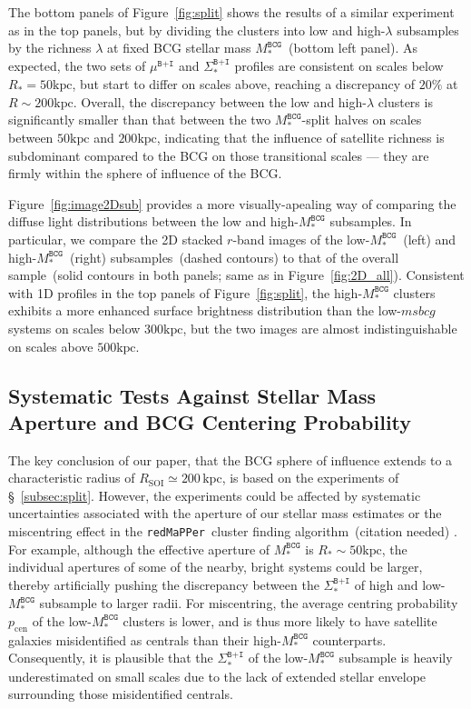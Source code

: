 \documentclass[fleqn,usenatbib]{mnras}
\newcommand{\rsoi}{R_{\mathrm{SOI}}}
\newcommand{\sigbi}{\Sigma_*^{\texttt{B+I}}}
\newcommand{\mubi}{\mu^{\texttt{B+I}}}
\newcommand{\msbcg}{M_*^{\texttt{BCG}}}
\newcommand{\kpc}{\mathrm{kpc}}
\newcommand{\pcen}{p_{\mathrm{cen}}}
\newcommand\xkchen[1]{{\color{cyan} {#1}}}
\newcommand*\citeme{{\color{green}(citation needed)}}
\newcommand\redmapper{\texttt{redMaPPer}}
\begin{document}
The bottom panels of Figure~\ref{fig:split} shows the results of a similar
experiment as in the top panels, but by dividing the clusters into low and
high-$\lambda$ subsamples by the richness $\lambda$ at fixed BCG stellar
mass $\msbcg$~(bottom left panel). As expected, the two sets of $\mubi$ and
$\sigbi$ profiles are consistent on scales below $R_*{=}50\kpc$, but start
to differ on scales above, reaching
a discrepancy of $20\%$ at $R{\sim}200\kpc$. Overall, the discrepancy
between the low and high-$\lambda$ clusters is significantly smaller than
that between the two $\msbcg$-split halves on scales between $50\kpc$ and
$200\kpc$, indicating that the influence of satellite richness is
subdominant compared to the BCG on those transitional scales --- they are
firmly within the sphere of influence of the BCG.



Figure~\ref{fig:image2Dsub} provides a more visually-apealing way of
comparing the diffuse light distributions between the low and high-$\msbcg$
subsamples.  In particular, we compare the 2D stacked $r$-band images of
the low-$\msbcg$~(left) and high-$\msbcg$~(right) subsamples~(dashed
contours) to that of the overall sample~(solid contours in both panels;
same as in Figure~\ref{fig:2D_all}). Consistent with 1D profiles in the top
panels of Figure~\ref{fig:split}, the high-$\msbcg$ clusters exhibits a
more enhanced surface brightness distribution than the low-$msbcg$ systems
on scales below $300\kpc$, but the two images are almost indistinguishable
on scales above $500\kpc$.


\subsection{Systematic Tests Against Stellar Mass Aperture and BCG
Centering Probability}
\label{subsec:test}


The key conclusion of our paper, that the BCG sphere of influence extends
to a characteristic radius of $\rsoi{\simeq}200\,\kpc$, is based on the
experiments of \S~\ref{subsec:split}. However, the experiments could be
affected by systematic uncertainties associated with the aperture of our
stellar mass estimates or the miscentring effect in the \redmapper~cluster
finding algorithm~\citeme \xkchen{\citep{Johnston2007, Oguri2011, Rozo2014, Hollowood2019} }. For example, although the effective aperture of
$\msbcg$ is $R_*{\sim}50\kpc$, the individual apertures of some of the
nearby, bright systems could be larger, thereby artificially pushing the
discrepancy between the $\sigbi$ of high and low-$\msbcg$ subsample to
larger radii. For miscentring, the average centring probability $\pcen$ of
the low-$\msbcg$ clusters is lower, and is thus more likely to have
satellite galaxies misidentified as centrals than their high-$\msbcg$
counterparts. Consequently, it is plausible that the $\sigbi$ of the
low-$\msbcg$ subsample is heavily underestimated on small scales due to the
lack of extended stellar envelope surrounding those misidentified centrals.
\end{document}
